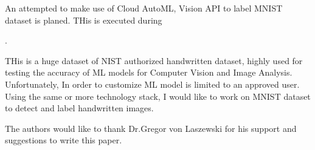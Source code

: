 An attempted to make use of Cloud AutoML, Vision API to label MNIST
dataset is planed. THis is executed during 

.

THis is a huge dataset of NIST authorized handwritten
dataset, highly used for testing the accuracy of ML models for
Computer Vision and Image Analysis. Unfortunately, In order to
customize ML model is limited to an approved user. Using the same or
more technology stack, I would like to work on MNIST dataset to detect
and label handwritten images.

\begin{acks}

  The authors would like to thank Dr.Gregor von Laszewski for his
  support and suggestions to write this paper.
  
\end{acks}

   
